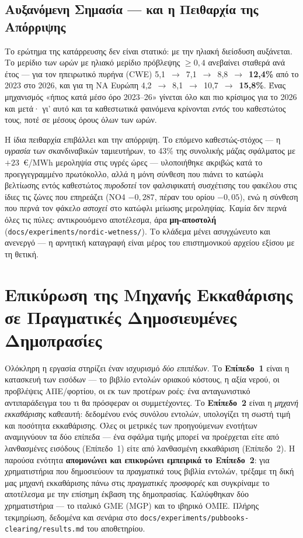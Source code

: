 \subsection{Αυξανόμενη Σημασία --- και η Πειθαρχία της Απόρριψης}
\label{subsec:collapse-growing}

Το ερώτημα της κατάρρευσης δεν είναι στατικό: με την ηλιακή διείσδυση αυξάνεται. Το μερίδιο των ωρών με ηλιακό μερίδιο πρόβλεψης $\ge 0{,}4$ ανεβαίνει σταθερά ανά έτος --- για τον ηπειρωτικό πυρήνα (CWE) 5,1~$\to$~7,1~$\to$~8,8~$\to$~\textbf{12,4\%} από το 2023 στο 2026, και για τη ΝΑ Ευρώπη 4,2~$\to$~8,1~$\to$~10,7~$\to$~\textbf{15,8\%}. Ένας μηχανισμός «ήπιος κατά μέσο όρο 2023--26» γίνεται όλο και πιο κρίσιμος για το 2026 και μετά· γι' αυτό και τα καθεστωτικά φαινόμενα κρίνονται \emph{εντός} του καθεστώτος τους, ποτέ σε μέσους όρους όλων των ωρών.

Η ίδια πειθαρχία επιβάλλει και την απόρριψη. Το επόμενο καθεστώς-στόχος --- η \emph{υγρασία} των σκανδιναβικών ταμιευτήρων, το 43\% της συνολικής μάζας σφάλματος με $+23$~€/MWh μεροληψία στις υγρές ώρες --- υλοποιήθηκε ακριβώς κατά το προεγγεγραμμένο πρωτόκολλο, αλλά η μόνη σύνθεση που πιάνει το κατώφλι βελτίωσης εντός καθεστώτος \emph{πυροδοτεί} τον φαλσιφικατή συσχέτισης του φακέλου στις ίδιες τις ζώνες που επηρεάζει (NO4 $-0{,}287$, πέραν του ορίου $-0{,}05$), ενώ η σύνθεση που περνά τον φάκελο \emph{αστοχεί} στο κατώφλι μείωσης μεροληψίας. Καμία δεν περνά όλες τις πύλες: αντικρουόμενο αποτέλεσμα, άρα \textbf{μη-αποστολή} (\texttt{docs/experiments/nordic-wetness/}). Το κλάδεμα μένει ασυγχώνευτο και ανενεργό --- η αρνητική καταγραφή είναι μέρος του επιστημονικού αρχείου εξίσου με τη θετική.


\section{Επικύρωση της Μηχανής Εκκαθάρισης σε Πραγματικές Δημοσιευμένες Δημοπρασίες}
\label{sec:pubbooks-clearing}

Ολόκληρη η εργασία στηρίζει έναν ισχυρισμό \emph{δύο επιπέδων}. Το \textbf{Επίπεδο~1} είναι η κατασκευή των εισόδων --- το βιβλίο εντολών οριακού κόστους, η αξία νερού, οι προβλέψεις ΑΠΕ/φορτίου, οι εκ των προτέρων ροές: ένα ανταγωνιστικό αντιπαράδειγμα του τι θα πρόσφεραν οι συμμετέχοντες. Το \textbf{Επίπεδο~2} είναι η \emph{μηχανή εκκαθάρισης} καθεαυτή: δεδομένου ενός συνόλου εντολών, υπολογίζει τη σωστή τιμή και ποσότητα εκκαθάρισης. Όλες οι μετρικές των προηγούμενων ενοτήτων αναμιγνύουν τα δύο επίπεδα --- ένα σφάλμα τιμής μπορεί να προέρχεται είτε από λανθασμένες εισόδους (Επίπεδο~1) είτε από λανθασμένη εκκαθάριση (Επίπεδο~2). Η παρούσα ενότητα \textbf{απομονώνει και επικυρώνει εμπειρικά το Επίπεδο~2}: για χρηματιστήρια που δημοσιεύουν τα \emph{πραγματικά} τους βιβλία εντολών, τρέξαμε τη δική μας μηχανή εκκαθάρισης πάνω στις \emph{πραγματικές προσφορές} και συγκρίναμε το αποτέλεσμα με την επίσημη έκβαση της δημοπρασίας. Καλύφθηκαν δύο χρηματιστήρια --- το ιταλικό GME (MGP) και το ιβηρικό OMIE. Πλήρης τεκμηρίωση, δεδομένα και σενάρια στο \texttt{docs/experiments/pubbooks-clearing/results.md} του αποθετηρίου.

